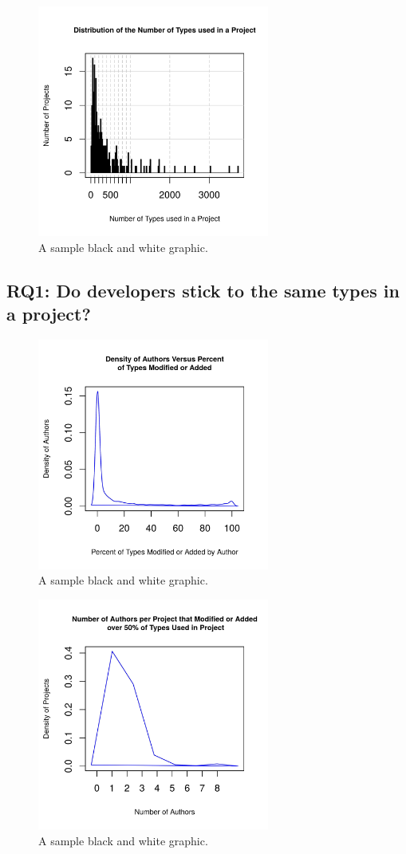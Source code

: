 \documentclass{sig-alternate-05-2015}
\begin{document}
\begin{figure}[ht]
\centering
\includegraphics[height=3in, width=3in]{../lib_stats_number_of_libraries_dist}
\caption{A sample black and white graphic.}
\end{figure}

\subsection{RQ1: Do developers stick to the same types in a project?}

\begin{figure}[ht]
\centering
\includegraphics[height=3in, width=3in]{../lib_stats_dist}
\caption{A sample black and white graphic.}
\end{figure}

\begin{figure}[ht]
\centering
\includegraphics[height=3in, width=3in]{../lib_stats_Threshold50_dist}
\caption{A sample black and white graphic.}
\end{figure}
\end{document}
